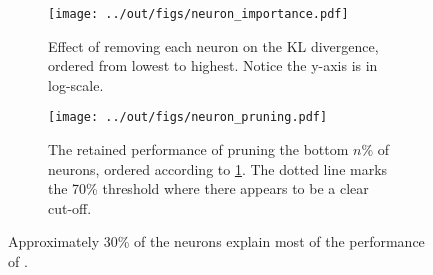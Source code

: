 \begin{figure}[t]
    \centering
    \begin{subfigure}[t]{0.46\textwidth}
        \texttt{[image: ../out/figs/neuron\_importance.pdf]}
        \caption{Effect of removing each neuron on the KL divergence, ordered from lowest to highest. Notice the y-axis is in log-scale.}
        \label{fig:neuron-importance}
    \end{subfigure}%
    \hfill
    \begin{subfigure}[t]{0.50\textwidth}
        \texttt{[image: ../out/figs/neuron\_pruning.pdf]}
        \caption{The retained performance of pruning the bottom $n\%$ of neurons, ordered according to \cref{fig:neuron-importance}. The dotted line marks the 70\% threshold where there appears to be a clear cut-off.}
        \label{fig:neuron-pruning}
    \end{subfigure}
    \caption{Approximately 30\% of the neurons explain most of the performance of \ttgpt.}
    \label{fig:neurons}
\end{figure}